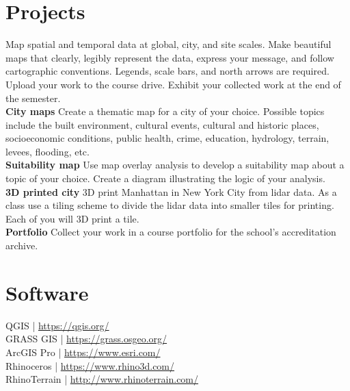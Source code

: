 \documentclass[11pt,article,oneside]{memoir}
\begin{document}

\section{Projects}
Map spatial and temporal data
at global, city, and site scales.
Make beautiful maps that 
clearly, legibly represent the data,
express your message, and
follow cartographic conventions.
Legends, scale bars, and north arrows are required.
Upload your work to the course drive.
Exhibit your collected work at the end of the semester.\\

\noindent \textbf{City maps}
Create a thematic map for a city of your choice. 
Possible topics include the built environment, 
cultural events, cultural and historic places, 
socioeconomic conditions, public health, crime, education, 
hydrology, terrain, levees, flooding, etc.\\

\noindent \textbf{Suitability map}
Use map overlay analysis 
to develop a suitability map
about a topic of your choice.
Create a diagram illustrating 
the logic of your analysis.\\

\noindent \textbf{3D printed city}
3D print Manhattan in New York City from lidar data. 
As a class use a tiling scheme 
to divide the lidar data into smaller tiles for printing.
Each of you will 3D print a tile.\\

\noindent \textbf{Portfolio}
Collect your work in a course portfolio 
for the school's accreditation archive.\\

\clearpage

\section{Software}
QGIS | \url{https://qgis.org/}\\
GRASS GIS | \url{https://grass.osgeo.org/}\\
ArcGIS Pro | \url{https://www.esri.com/}\\
Rhinoceros | \url{https://www.rhino3d.com/}\\
RhinoTerrain | \url{http://www.rhinoterrain.com/}\\
\end{document}
